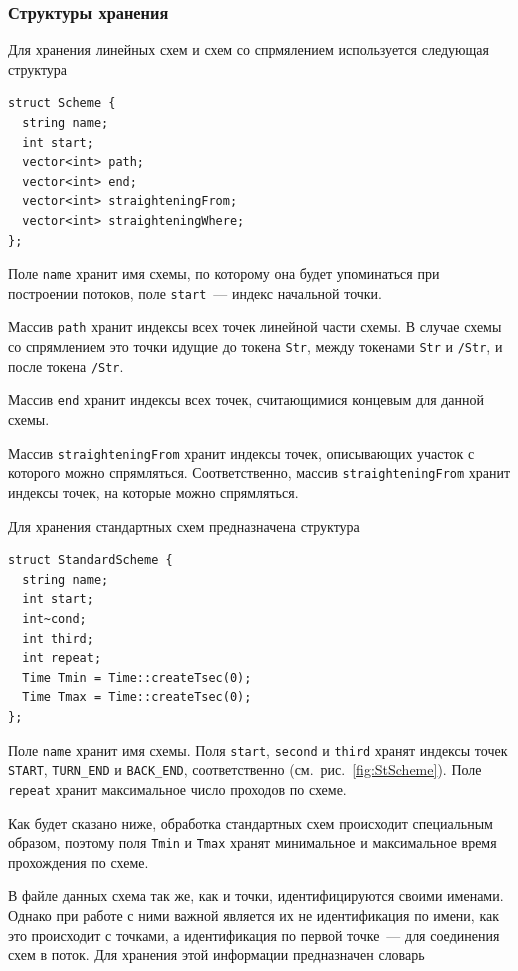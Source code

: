 \documentclass[12pt]{article}
\theoremstyle{plain}
\begin{document}
\subsubsection{Структуры хранения}
\label{sec:SchemeStructures}

Для хранения линейных схем и схем со спрмялением используется следующая структура
\begin{verbatim}
struct Scheme {
  string name;
  int start;
  vector<int> path;
  vector<int> end;
  vector<int> straighteningFrom;
  vector<int> straighteningWhere;
}; 
\end{verbatim}

Поле \texttt{name} хранит имя схемы, по которому она будет упоминаться при построении потоков, поле \texttt{start}~--- индекс начальной точки. 

Массив \texttt{path} хранит индексы всех точек линейной части схемы. В случае схемы со спрямлением это точки идущие до токена \texttt{Str}, между токенами \texttt{Str} и \texttt{/Str}, и после токена \texttt{/Str}.

Массив \texttt{end} хранит индексы всех точек, считающимися концевым для данной схемы.

Массив \texttt{straighteningFrom} хранит индексы точек, описывающих участок с которого можно спрямляться. Соответственно, массив \texttt{straighteningFrom} хранит индексы точек, на которые можно спрямляться.

\medskip

Для хранения стандартных схем предназначена структура
\begin{verbatim}
struct StandardScheme {
  string name;
  int start;
  int~сond; 
  int third; 
  int repeat;
  Time Tmin = Time::createTsec(0);
  Time Tmax = Time::createTsec(0);
};
\end{verbatim}

Поле \texttt{name} хранит имя схемы. Поля \texttt{start}, \texttt{second} и \texttt{third} хранят индексы точек \texttt{START}, \texttt{TURN\_END} и \texttt{BACK\_END}, соответственно (см.~рис.~\ref{fig:StScheme}). Поле \texttt{repeat} хранит максимальное число проходов по схеме. 

Как будет сказано ниже, обработка стандартных схем происходит специальным образом, поэтому поля \texttt{Tmin} и \texttt{Tmax} хранят минимальное и максимальное время прохождения по схеме.

\medskip

В файле данных схема так же, как и точки, идентифицируются своими именами. Однако при работе с ними важной является их не идентификация по имени, как это происходит с точками, а идентификация по первой точке~--- для соединения схем в поток. Для хранения этой информации предназначен словарь
\end{document}
